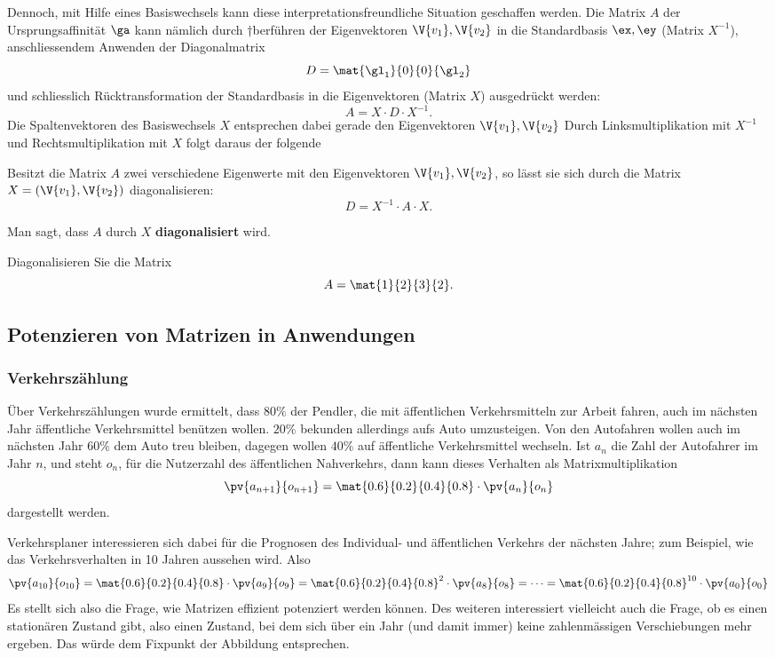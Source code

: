 \documentclass[%
11pt,%
twoside,%
titlepage,%
german,%
headsepline%
]{scrartcl}
\begin{document}
Dennoch, mit Hilfe eines Basiswechsels kann diese interpretationsfreundliche Situation geschaffen werden. Die Matrix $A$ der Ursprungsaffinität $\ga$ kann nämlich durch †berführen der Eigenvektoren $\V{v_1}, \V{v_2}$ in die Standardbasis $\ex, \ey$ (Matrix $X^{-1}$), anschliessendem Anwenden der Diagonalmatrix
$$D=\mat{\gl_1}{0}{0}{\gl_2}$$
und schliesslich Rücktransformation der
Standardbasis in die Eigenvektoren (Matrix $X$) ausgedrückt werden:
$$A=X\cdot D\cdot X^{-1}.$$
Die Spaltenvektoren des Basiswechsels $X$ entsprechen dabei gerade den Eigenvektoren $\V{v_1}, \V{v_2}$ Durch Linksmultiplikation mit $X^{-1}$ und Rechtsmultiplikation mit $X$ folgt daraus der folgende

\begin{satz}
Besitzt die Matrix $A$ zwei verschiedene Eigenwerte mit den Eigenvektoren $\V{v_1}, \V{v_2}$, so lässt sie sich durch die Matrix $X=(\V{v_1}, \V{v_2})$ diagonalisieren:
$$D=X^{-1}\cdot A\cdot X.$$
\end{satz}

Man sagt, dass $A$ durch $X$ \textbf{diagonalisiert} wird.

\begin{ueb}
Diagonalisieren Sie die Matrix
$$A=\mat{1}{2}{3}{2}.$$
\end{ueb}

\subsection{Potenzieren von Matrizen in Anwendungen}

\subsubsection{Verkehrszählung}

\begin{bsp}
Über Verkehrszählungen wurde ermittelt, dass $80\%$ der Pendler, die mit äffentlichen Verkehrsmitteln zur Arbeit fahren, auch im nächsten Jahr äffentliche Verkehrsmittel benützen wollen. $20\%$ bekunden allerdings aufs Auto umzusteigen. Von den Autofahren wollen auch im nächsten Jahr $60\%$ dem Auto treu bleiben, dagegen wollen $40\%$ auf äffentliche Verkehrsmittel wechseln. Ist $a_n$ die Zahl der Autofahrer im Jahr $n$, und steht $o_n$, für die Nutzerzahl des äffentlichen Nahverkehrs, dann kann dieses Verhalten als Matrixmultiplikation
$$\pv{a_{n+1}}{o_{n+1}}=\mat{0.6}{0.2}{0.4}{0.8}\cdot\pv{a_n}{o_n}$$
dargestellt werden.

Verkehrsplaner interessieren sich dabei für die Prognosen des Individual- und äffentlichen Verkehrs der nächsten Jahre; zum Beispiel, wie das Verkehrsverhalten in 10 Jahren aussehen wird. Also
$$
\pv{a_{10}}{o_{10}}=\mat{0.6}{0.2}{0.4}{0.8}\cdot\pv{a_9}{o_9}=\mat{0.6}{0.2}{0.4}{0.8}^2\cdot\pv{a_8}{o_8}=\dots=\mat{0.6}{0.2}{0.4}{0.8}^{10}\cdot\pv{a_0}{o_0}
$$
Es stellt sich also die Frage, wie Matrizen effizient potenziert werden können. Des weiteren interessiert vielleicht auch die Frage, ob es einen stationären Zustand gibt, also einen Zustand, bei dem sich über ein Jahr (und damit immer) keine zahlenmässigen Verschiebungen mehr ergeben. Das würde dem Fixpunkt der Abbildung entsprechen.
\end{bsp}
\end{document}
